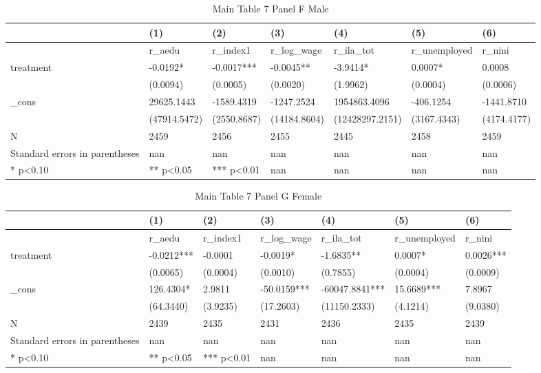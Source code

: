 \documentclass[11pt]{article}
\begin{document}
\clearpage
\begin{table}[!htbp]
\centering
\caption{Main Table 7 Panel F Male}
\label{tab:table7f_m}
\begin{tabular}{lllllll}
\toprule
 & (1) & (2) & (3) & (4) & (5) & (6) \\
\midrule
 & r\_aedu & r\_index1 & r\_log\_wage & r\_ila\_tot & r\_unemployed & r\_nini \\
treatment & -0.0192* & -0.0017*** & -0.0045** & -3.9414* & 0.0007* & 0.0008 \\
 & (0.0094) & (0.0005) & (0.0020) & (1.9962) & (0.0004) & (0.0006) \\
\_cons & 29625.1443 & -1589.4319 & -1247.2524 & 1954863.4096 & -406.1254 & -1441.8710 \\
 & (47914.5472) & (2550.8687) & (14184.8604) & (12428297.2151) & (3167.4343) & (4174.4177) \\
N & 2459 & 2456 & 2455 & 2445 & 2458 & 2459 \\
Standard errors in parentheses & nan & nan & nan & nan & nan & nan \\
* p<0.10 & ** p<0.05 & *** p<0.01 & nan & nan & nan & nan \\
\bottomrule
\end{tabular}

\end{table}

\clearpage
\begin{table}[!htbp]
\centering
\caption{Main Table 7 Panel G Female}
\label{tab:table7g_f}
\begin{tabular}{lllllll}
\toprule
 & (1) & (2) & (3) & (4) & (5) & (6) \\
\midrule
 & r\_aedu & r\_index1 & r\_log\_wage & r\_ila\_tot & r\_unemployed & r\_nini \\
treatment & -0.0212*** & -0.0001 & -0.0019* & -1.6835** & 0.0007* & 0.0026*** \\
 & (0.0065) & (0.0004) & (0.0010) & (0.7855) & (0.0004) & (0.0009) \\
\_cons & 126.4304* & 2.9811 & -50.0159*** & -60047.8841*** & 15.6689*** & 7.8967 \\
 & (64.3440) & (3.9235) & (17.2603) & (11150.2333) & (4.1214) & (9.0380) \\
N & 2439 & 2435 & 2431 & 2436 & 2435 & 2439 \\
Standard errors in parentheses & nan & nan & nan & nan & nan & nan \\
* p<0.10 & ** p<0.05 & *** p<0.01 & nan & nan & nan & nan \\
\bottomrule
\end{tabular}

\end{table}
\end{document}

